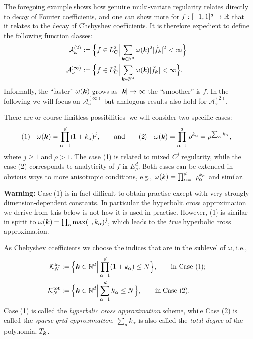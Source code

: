 The foregoing example shows how genuine multi-variate regularity
relates directly to decay of Fourier coefficients, and one can show more
for $f: [-1,1]^d \to \mathbb{R}$ that it relates to the decay of Chebyshev
coefficients. It is therefore expedient to define the following function classes:
\begin{align*}
    \mathcal{A}_\omega^{(2)}
    &:=
        \Big\{ f \in L^2_{\rm C} \Big|
             \sum_{{\bm k} \in \mathbb{N}^d} \omega({\bm k})^2 |\tilde{f}_{\bm k}|^2 < \infty \Big\} \\
    \mathcal{A}_\omega^{(\infty)}
    &:=
    \Big\{ f \in L^2_{\rm C} \Big|
    \sum_{{\bm k} \in \mathbb{N}^d} \omega({\bm k}) |\tilde{f}_{\bm k}| < \infty \Big\}.
\end{align*}
Informally, the ``faster'' $\omega({\bm k})$ grows as $|{\bm k}| \to \infty$ the
``smoother'' is $f$. In the following we will focus on
$\mathcal{A}_\omega^{(\infty)}$ but analogous results also hold for
$\mathcal{A}_\omega^{(2)}$.

There are or course limitless possibilities, we will consider two specific
cases:
\[
    (1) \quad \omega({\bm k}) = \prod_{\alpha = 1}^d (1+k_\alpha)^j,
    \qquad \text{and} \qquad
    (2) \quad \omega({\bm k}) = \prod_{\alpha = 1}^d \rho^{k_\alpha} = \rho^{\sum_\alpha k_\alpha},
\]
where $j \geq 1$ and $\rho > 1$. The case (1) is related to mixed $C^j$
regularity, while the case (2) corresponds to analyticity of $f$ in
$E_{\rho}^d$. Both cases can be extended in obvious ways to more anisotropic
conditions, e.g., $\omega({\bm k}) = \prod_{\alpha = 1}^d \rho_\alpha^{k_\alpha}$
and similar.

{\bf Warning: } Case (1) is in fact difficult to obtain practise except with very strongly dimension-dependent constants. In particular the hyperbolic cross approximation we derive from this below is not how it is used in practise.
However, (1) is similar in spirit to $\omega({\bm k}) = \prod_\alpha \max(1, k_\alpha)^j$, which leads to the {\em true} hyperbolic cross approximation.

As Chebyshev coefficients we choose the indices that are in the
sublevel of $\omega$, i.e.,
\begin{align*}
    \mathcal{K}_N^{\rm hc} &:= \Big\{ {\bm k} \in \mathbb{N}^d \Big| \prod_{\alpha=1}^d (1+k_\alpha) \leq N \Big\},
    \qquad \text{in Case (1);} \\
    \mathcal{K}_N^{\rm tot} &:= \Big\{ {\bm k}  \in \mathbb{N}^d \Big| \sum_{\alpha = 1}^d k_\alpha \leq N \Big\},
    \qquad \text{in Case (2).}
\end{align*}
Case (1) is called the {\em hyperbolic cross approximation} scheme, while Case
(2) is called the {\em sparse grid approximation}. $\sum_\alpha k_\alpha$ is also called the {\em total degree} of the polynomial $T_{{\bm k}}$.

